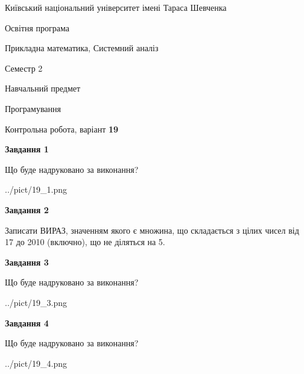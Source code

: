 \documentclass[12pt, ukrainian]{article}
\begin{document}
{{\begin {small}\par
{ \center  Київський національний університет імені Тараса Шевченка \par}
{\parbox {5 cm}{Освітня програма \hfill}{\parbox {8 cm}{Прикладна математика, Системний аналіз \hfill}}\parbox {5 cm}{\hfill Семестр 2}}\par
{\parbox {5 cm} {Навчальний предмет \hfill}\parbox {7 cm}{Програмування \hfill}\parbox {6cm}{\hfill}\par}\vspace{-7pt} \end{small}}{\center Контрольна робота, варіант  \No \textbf
{ 19 }\par}}
{
\begin {large}
{\begin {center}\textbf{Завдання 1}\end {center}}\par
Що буде надруковано за виконання?\par\par
\begin{center}
	{../pict/19_1.png}
\end{center}
\newpage

{\begin {center}\textbf{Завдання 2}\end {center}}\par
Записати ВИРАЗ, значенням якого є множина, що складається з цілих чисел від 17 до 2010 (включно), що не діляться на 5.\par
\newpage

{\begin {center}\textbf{Завдання 3}\end {center}}\par
Що буде надруковано за виконання?\par
\begin{center}
	{../pict/19_3.png}
\end{center}
\newpage

{\begin {center}\textbf{Завдання 4}\end {center}}\par
Що буде надруковано за виконання?\par
\begin{center}
	{../pict/19_4.png}
\end{center}
\newpage


\end{large}}
\end{document}
